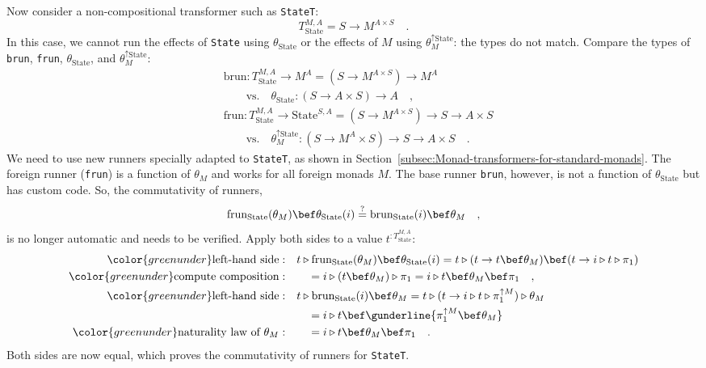 Now consider a non-compositional transformer such as \lstinline!StateT!:
\[
T_{\text{State}}^{M,A}=S\rightarrow M^{A\times S}\quad.
\]
In this case, we cannot run the effects of \lstinline!State! using
$\theta_{\text{State}}$ or the effects of $M$ using $\theta_{M}^{\uparrow\text{State}}$:
the types do not match. Compare the types of \lstinline!brun!, \lstinline!frun!,
$\theta_{\text{State}}$, and $\theta_{M}^{\uparrow\text{State}}$:
\begin{align*}
 & \text{brun}:T_{\text{State}}^{M,A}\rightarrow M^{A}=(S\rightarrow M^{A\times S})\rightarrow M^{A}\\
 & \quad\quad\text{vs.}\quad\theta_{\text{State}}:\left(S\rightarrow A\times S\right)\rightarrow A\quad,\\
 & \text{frun}:T_{\text{State}}^{M,A}\rightarrow\text{State}^{S,A}=(S\rightarrow M^{A\times S})\rightarrow S\rightarrow A\times S\\
 & \quad\quad\text{vs.}\quad\theta_{M}^{\uparrow\text{State}}:(S\rightarrow M^{A}\times S)\rightarrow S\rightarrow A\times S\quad.
\end{align*}
We need to use new runners specially adapted to \lstinline!StateT!,
as shown in Section~\ref{subsec:Monad-transformers-for-standard-monads}.
The foreign runner (\lstinline!frun!) is a function of $\theta_{M}$
and works for all foreign monads $M$. The base runner \lstinline!brun!,
however, is not a function of $\theta_{\text{State}}$ but has custom
code. So, the commutativity of runners,
\[
\text{frun}_{\text{State}}(\theta_{M})\bef\theta_{\text{State}}(i)\overset{?}{=}\text{brun}_{\text{State}}(i)\bef\theta_{M}\quad,
\]
is no longer automatic and needs to be verified. Apply both sides
to a value $t^{:T_{\text{State}}^{M,A}}$:
\begin{align*}
{\color{greenunder}\text{left-hand side}:}\quad & t\triangleright\text{frun}_{\text{State}}(\theta_{M})\bef\theta_{\text{State}}(i)=t\triangleright(t\rightarrow t\bef\theta_{M})\bef(t\rightarrow i\triangleright t\triangleright\pi_{1})\\
{\color{greenunder}\text{compute composition}:}\quad & \quad=i\triangleright(t\bef\theta_{M})\triangleright\pi_{1}=i\triangleright t\bef\theta_{M}\bef\pi_{1}\quad,\\
{\color{greenunder}\text{left-hand side}:}\quad & t\triangleright\text{brun}_{\text{State}}(i)\bef\theta_{M}=t\triangleright(t\rightarrow i\triangleright t\triangleright\pi_{1}^{\uparrow M})\triangleright\theta_{M}\\
 & \quad=i\triangleright t\bef\gunderline{\pi_{1}^{\uparrow M}\bef\theta_{M}}\\
{\color{greenunder}\text{naturality law of }\theta_{M}:}\quad & \quad=i\triangleright t\bef\theta_{M}\bef\pi_{1}\quad.
\end{align*}
Both sides are now equal, which proves the commutativity of runners
for \lstinline!StateT!.

